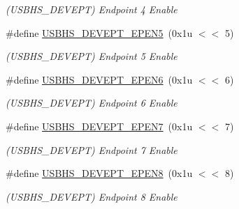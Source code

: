 \begin{DoxyCompactItemize}
\begin{DoxyCompactList}\small\item\em (U\+S\+B\+H\+S\+\_\+\+D\+E\+V\+E\+PT) Endpoint 4 Enable \end{DoxyCompactList}\item 
\mbox{\label{group__SAME70__USBHS_ga129a8c5968a36f6a8c95fe96a9ba69bb}} 
\#define \mbox{\hyperlink{group__SAME70__USBHS_ga129a8c5968a36f6a8c95fe96a9ba69bb}{U\+S\+B\+H\+S\+\_\+\+D\+E\+V\+E\+P\+T\+\_\+\+E\+P\+E\+N5}}~(0x1u $<$$<$ 5)
\begin{DoxyCompactList}\small\item\em (U\+S\+B\+H\+S\+\_\+\+D\+E\+V\+E\+PT) Endpoint 5 Enable \end{DoxyCompactList}\item 
\mbox{\label{group__SAME70__USBHS_gaf558bdac0b92e81eb1efa72b184c9fbb}} 
\#define \mbox{\hyperlink{group__SAME70__USBHS_gaf558bdac0b92e81eb1efa72b184c9fbb}{U\+S\+B\+H\+S\+\_\+\+D\+E\+V\+E\+P\+T\+\_\+\+E\+P\+E\+N6}}~(0x1u $<$$<$ 6)
\begin{DoxyCompactList}\small\item\em (U\+S\+B\+H\+S\+\_\+\+D\+E\+V\+E\+PT) Endpoint 6 Enable \end{DoxyCompactList}\item 
\mbox{\label{group__SAME70__USBHS_gab90a8c74e8571613e2e42b2058569e12}} 
\#define \mbox{\hyperlink{group__SAME70__USBHS_gab90a8c74e8571613e2e42b2058569e12}{U\+S\+B\+H\+S\+\_\+\+D\+E\+V\+E\+P\+T\+\_\+\+E\+P\+E\+N7}}~(0x1u $<$$<$ 7)
\begin{DoxyCompactList}\small\item\em (U\+S\+B\+H\+S\+\_\+\+D\+E\+V\+E\+PT) Endpoint 7 Enable \end{DoxyCompactList}\item 
\mbox{\label{group__SAME70__USBHS_ga3a373963e79552b55d5c58576acd26e8}} 
\#define \mbox{\hyperlink{group__SAME70__USBHS_ga3a373963e79552b55d5c58576acd26e8}{U\+S\+B\+H\+S\+\_\+\+D\+E\+V\+E\+P\+T\+\_\+\+E\+P\+E\+N8}}~(0x1u $<$$<$ 8)
\begin{DoxyCompactList}\small\item\em (U\+S\+B\+H\+S\+\_\+\+D\+E\+V\+E\+PT) Endpoint 8 Enable \end{DoxyCompactList}\item 

\end{DoxyCompactItemize}
